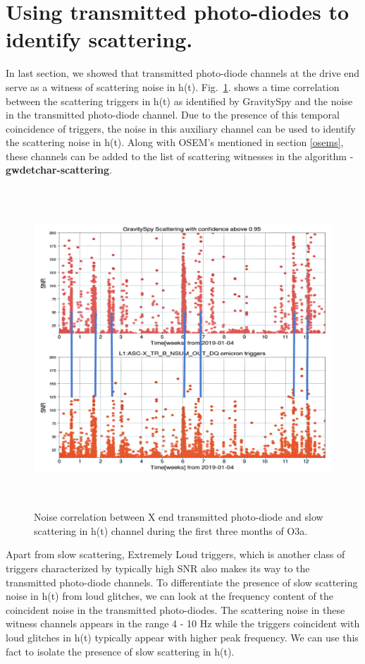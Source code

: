 \documentclass[12pt]{iopart}
\begin{document}
 
\section{Using transmitted photo-diodes to identify scattering.}\label{transmonwitness}
In last section, we showed that transmitted photo-diode channels at the drive end serve as a witness of scattering noise in h(t). Fig.~\ref{fig:transetmx}. shows a time correlation between the scattering triggers in h(t) as identified by GravitySpy and the noise in the transmitted photo-diode channel. Due to the presence of this temporal coincidence of triggers, the noise in this auxiliary channel can be used to identify the scattering noise in h(t). Along with OSEM’s mentioned in section \ref{osems}, these channels can be added to the list of scattering witnesses in the algorithm - \textbf{gwdetchar-scattering}.

\begin{figure}[h]
  \centering
         \includegraphics[width = 12cm,height=12cm]{hxtrb_corr1.jpg}
         \caption{Noise correlation between X end transmitted photo-diode and slow scattering in h(t) channel during the first three months of O3a.}
    \label{fig:transetmx}
\end{figure}

Apart from slow scattering, Extremely Loud triggers, which is another class of triggers characterized by typically high SNR also makes its way to the transmitted photo-diode channels. To differentiate the presence of slow scattering noise in h(t) from loud glitches, we can look at the frequency content of the coincident noise in the transmitted photo-diodes. The scattering noise in these witness channels appears in the range  4 - 10 Hz while the triggers coincident with loud glitches in h(t) typically appear with higher peak frequency. We can use this fact to isolate the presence of slow scattering in h(t).
\end{document}
